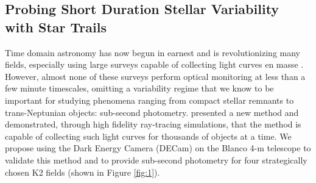 \documentclass[11pt]{article}
\begin{document}

\subsection*{Probing Short Duration Stellar Variability with Star Trails}


Time domain astronomy has now begun in earnest and is revolutionizing many fields, especially using large surveys capable of collecting light curves en masse \citep{2012IAUS..285..141D}. However, almost none of these surveys perform optical monitoring at less than a few minute timescales, omitting a variability regime that we know to be important for studying phenomena ranging from compact stellar remnants to trans-Neptunian objects: sub-second photometry. \citealt{2018arXiv180806977T} presented a new method and demonstrated, through high fidelity ray-tracing simulations, that the method is capable of collecting such light curves for thousands of objects at a time. We propose using the Dark Energy Camera (DECam) on the Blanco 4-m telescope to validate this method and to provide sub-second photometry for four strategically chosen K2 fields (shown in Figure \ref{fig:1}).


\end{document}
